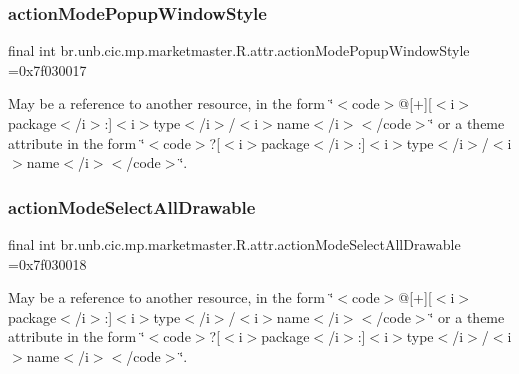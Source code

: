 \subsubsection{\texorpdfstring{action\+Mode\+Popup\+Window\+Style}{actionModePopupWindowStyle}}
{\footnotesize\ttfamily final int br.\+unb.\+cic.\+mp.\+marketmaster.\+R.\+attr.\+action\+Mode\+Popup\+Window\+Style =0x7f030017\hspace{0.3cm}{\ttfamily [static]}}

May be a reference to another resource, in the form \char`\"{}$<$code$>$@\mbox{[}+\mbox{]}\mbox{[}$<$i$>$package$<$/i$>$\+:\mbox{]}$<$i$>$type$<$/i$>$/$<$i$>$name$<$/i$>$$<$/code$>$\char`\"{} or a theme attribute in the form \char`\"{}$<$code$>$?\mbox{[}$<$i$>$package$<$/i$>$\+:\mbox{]}$<$i$>$type$<$/i$>$/$<$i$>$name$<$/i$>$$<$/code$>$\char`\"{}. \mbox{\label{classbr_1_1unb_1_1cic_1_1mp_1_1marketmaster_1_1R_1_1attr_a4534e9015d60c162180fb7c279210d21}} 
\subsubsection{\texorpdfstring{action\+Mode\+Select\+All\+Drawable}{actionModeSelectAllDrawable}}
{\footnotesize\ttfamily final int br.\+unb.\+cic.\+mp.\+marketmaster.\+R.\+attr.\+action\+Mode\+Select\+All\+Drawable =0x7f030018\hspace{0.3cm}{\ttfamily [static]}}

May be a reference to another resource, in the form \char`\"{}$<$code$>$@\mbox{[}+\mbox{]}\mbox{[}$<$i$>$package$<$/i$>$\+:\mbox{]}$<$i$>$type$<$/i$>$/$<$i$>$name$<$/i$>$$<$/code$>$\char`\"{} or a theme attribute in the form \char`\"{}$<$code$>$?\mbox{[}$<$i$>$package$<$/i$>$\+:\mbox{]}$<$i$>$type$<$/i$>$/$<$i$>$name$<$/i$>$$<$/code$>$\char`\"{}. \mbox{\label{classbr_1_1unb_1_1cic_1_1mp_1_1marketmaster_1_1R_1_1attr_a1406c46da78bb755e2593ca4bc1346ca}} 
